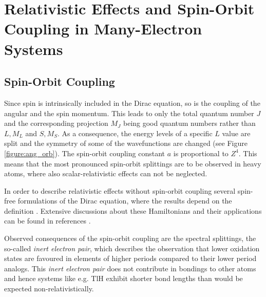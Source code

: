 \section{Relativistic Effects and Spin-Orbit Coupling in Many-Electron Systems}
\subsection{Spin-Orbit Coupling}
Since spin is intrinsically included in the Dirac equation, so is the
coupling of the angular and the spin momentum. This leads to
only the total quantum number $J$ and the corresponding projection $M_J$
being good quantum numbers rather than $L, M_L$ and $S, M_S$. As a
consequence, the energy levels of a specific $L$ value are split and the
symmetry of some of the wavefunctions are changed (see Figure
\ref{figure:ang_orb}).
The spin-orbit coupling constant $a$ is proportional to $Z^4$.
This means that the most pronounced spin-orbit splittings are to be observed
in heavy atoms, where also scalar-relativistic effects can not be
neglected.

In order to describe relativistic effects without spin-orbit coupling
several spin-free formulations of the Dirac equation, where the results
depend on the definition \cite{Visscher99}.
Extensive discussions about these Hamiltonians and their applications
can be found in references \cite{ReiherWolf09,Saue11}.

Observed consequences of the spin-orbit coupling are the spectral splittings,
the so-called \emph{inert electron
pair}, which describes the observation that lower oxidation states
are favoured in elements of higher periods compared to their lower period
analogs. This \emph{inert electron pair} does not contribute in bondings
to other atoms and hence systems like e.g. TlH exhibit shorter bond lengths
than would be expected non-relativistically.


